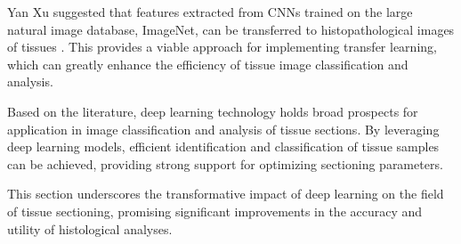 Yan Xu suggested that features extracted from CNNs trained on the large natural image database, ImageNet, can be transferred to histopathological images of tissues \cite{LR.9}. This provides a viable approach for implementing transfer learning, which can greatly enhance the efficiency of tissue image classification and analysis.

Based on the literature, deep learning technology holds broad prospects for application in image classification and analysis of tissue sections. By leveraging deep learning models, efficient identification and classification of tissue samples can be achieved, providing strong support for optimizing sectioning parameters.

This section underscores the transformative impact of deep learning on the field of tissue sectioning, promising significant improvements in the accuracy and utility of histological analyses.








